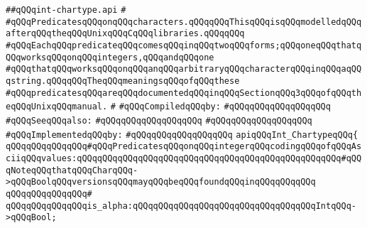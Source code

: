 \label{src/lib/std/src/int-chartype.api}
\verb|##qQQqint-chartype.api|\newline
\verb|#|\newline
\verb|#qQQqPredicatesqQQqonqQQqcharacters.qQQqqQQqThisqQQqisqQQqmodelledqQQqafterqQQqtheqQQqUnixqQQqCqQQqlibraries.qQQqqQQq|\newline
\verb|#qQQqEachqQQqpredicateqQQqcomesqQQqinqQQqtwoqQQqforms;qQQqoneqQQqthatqQQqworksqQQqonqQQqintegers,qQQqandqQQqone|\newline
\verb|#qQQqthatqQQqworksqQQqonqQQqanqQQqarbitraryqQQqcharacterqQQqinqQQqaqQQqstring.qQQqqQQqTheqQQqmeaningsqQQqofqQQqthese|\newline
\verb|#qQQqpredicatesqQQqareqQQqdocumentedqQQqinqQQqSectionqQQq3qQQqofqQQqtheqQQqUnixqQQqmanual.|\newline
\verb|#|\newline
\newline
\verb|#qQQqCompiledqQQqby:|\newline
\verb|#qQQqqQQqqQQqqQQqqQQq|\newline
\newline
\verb|#qQQqSeeqQQqalso:|\newline
\verb|#qQQqqQQqqQQqqQQqqQQq|\newline
\verb|#qQQqqQQqqQQqqQQqqQQq|\newline
\newline
\verb|#qQQqImplementedqQQqby:|\newline
\verb|#qQQqqQQqqQQqqQQqqQQq|\newline
\newline
\verb|apiqQQqInt_ChartypeqQQq{|\newline
\newline
\verb|qQQqqQQqqQQqqQQq#qQQqPredicatesqQQqonqQQqintegerqQQqcodingqQQqofqQQqAsciiqQQqvalues:qQQqqQQqqQQqqQQqqQQqqQQqqQQqqQQqqQQqqQQqqQQqqQQqqQQq#qQQqNoteqQQqthatqQQqCharqQQq->qQQqBoolqQQqversionsqQQqmayqQQqbeqQQqfoundqQQqinqQQqqQQqqQQq|\newline
\verb|qQQqqQQqqQQqqQQq#|\newline
\verb|qQQqqQQqqQQqqQQqis_alpha:qQQqqQQqqQQqqQQqqQQqqQQqqQQqqQQqqQQqIntqQQq->qQQqBool;|\newline
